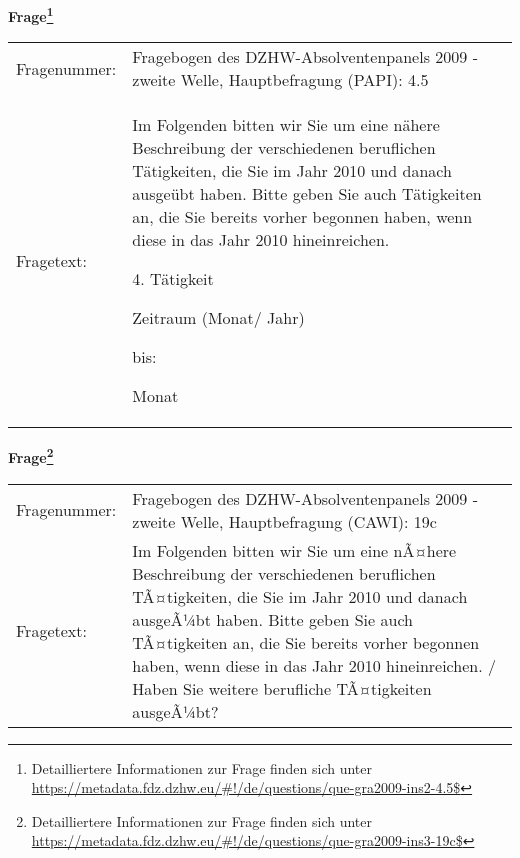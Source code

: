 				\vspace*{0.5cm}
                \noindent\textbf{Frage\footnote{Detailliertere Informationen zur Frage finden sich unter
		              \url{https://metadata.fdz.dzhw.eu/\#!/de/questions/que-gra2009-ins2-4.5$}}}\\
				\begin{tabularx}{\hsize}{@{}lX}
					Fragenummer: &
					  Fragebogen des DZHW-Absolventenpanels 2009 - zweite Welle, Hauptbefragung (PAPI):
					  4.5
 \\
					Fragetext: & Im Folgenden bitten wir Sie um eine nähere Beschreibung der verschiedenen beruflichen Tätigkeiten, die Sie im Jahr 2010 und danach ausgeübt haben. Bitte geben Sie auch Tätigkeiten an, die Sie bereits vorher begonnen haben, wenn diese in das Jahr 2010 hineinreichen.\par  4. Tätigkeit\par  Zeitraum (Monat/ Jahr)\par  bis:\par  Monat \\
				\end{tabularx}
				\vspace*{0.5cm}
                \noindent\textbf{Frage\footnote{Detailliertere Informationen zur Frage finden sich unter
		              \url{https://metadata.fdz.dzhw.eu/\#!/de/questions/que-gra2009-ins3-19c$}}}\\
				\begin{tabularx}{\hsize}{@{}lX}
					Fragenummer: &
					  Fragebogen des DZHW-Absolventenpanels 2009 - zweite Welle, Hauptbefragung (CAWI):
					  19c
 \\
					Fragetext: & Im Folgenden bitten wir Sie um eine nÃ¤here Beschreibung der verschiedenen beruflichen TÃ¤tigkeiten, die Sie im Jahr 2010 und danach ausgeÃ¼bt haben. Bitte geben Sie auch TÃ¤tigkeiten an, die Sie bereits vorher begonnen haben, wenn diese in das Jahr 2010 hineinreichen. / Haben Sie weitere berufliche TÃ¤tigkeiten ausgeÃ¼bt? \\
				\end{tabularx}





